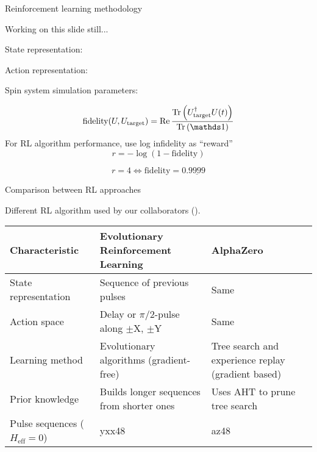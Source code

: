 \documentclass{beamer}
\begin{document}
%
%

\begin{frame}{Reinforcement learning methodology}


Working on this slide still...

State representation:

Action representation:

Spin system simulation parameters:


\[
    \text{fidelity}(U, U_\text{target}) = \Re{
        \frac{\Tr{U_\text{target}^\dagger U(t)}}{\Tr{\identity}}
    }
\]
For RL algorithm performance, use log infidelity as ``reward''
\[
    r = -\log \left( 1 - \text{fidelity} \right)
\]

\[
r = 4 \iff \text{fidelity} = 0.\underline{9999}
\]


\end{frame}

\begin{frame}{Comparison between RL approaches}

Different RL algorithm used by our collaborators (\cite{peng2021deep}).

\begin{table}
\centering
\begin{footnotesize}
\begin{tabular}{p{}|p{}|p{}}
    Characteristic & Evolutionary Reinforcement Learning & AlphaZero \\
    \hline
    State representation & Sequence of previous pulses & Same \\
    \hline
    Action space & Delay or $\pi/2$-pulse along $\pm$X, $\pm$Y & Same \\
    \hline
    Learning method & Evolutionary algorithms (gradient-free) & Tree search and experience replay (gradient based) \\
    \hline
    Prior knowledge & Builds longer sequences from shorter ones & Uses AHT to prune tree search \\
    \hline
    Pulse sequences ($H_\text{eff} = 0$) & yxx48 & az48
\end{tabular}
\end{footnotesize}
\end{table}

\end{frame}
\end{document}
